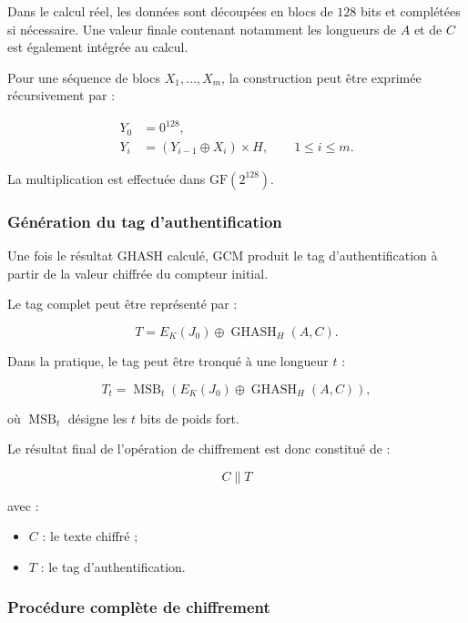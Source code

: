 \documentclass[12pt,a4paper]{article}
\begin{document}
Dans le calcul réel, les données sont découpées en blocs de $128$ bits
et complétées si nécessaire. Une valeur finale contenant notamment
les longueurs de $A$ et de $C$ est également intégrée au calcul.

Pour une séquence de blocs $X_1,\ldots,X_m$, la construction peut être
exprimée récursivement par :

\begin{align}
Y_0 &= 0^{128},\\
Y_i &= (Y_{i-1} \oplus X_i)\times H,
\qquad 1\leq i\leq m.
\end{align}

La multiplication est effectuée dans $\mathrm{GF}(2^{128})$.

\subsubsection{Génération du tag d'authentification}

Une fois le résultat GHASH calculé, GCM produit le tag
d'authentification à partir de la valeur chiffrée du compteur initial.

Le tag complet peut être représenté par :

\begin{equation}
T =
E_K(J_0)
\oplus
\operatorname{GHASH}_H(A,C).
\label{eq:gcm_tag}
\end{equation}

Dans la pratique, le tag peut être tronqué à une longueur $t$ :

\begin{equation}
T_t =
\operatorname{MSB}_t
\left(
E_K(J_0)
\oplus
\operatorname{GHASH}_H(A,C)
\right),
\end{equation}

où $\operatorname{MSB}_t$ désigne les $t$ bits de poids fort.

Le résultat final de l'opération de chiffrement est donc constitué de :

\begin{equation}
\boxed{C \parallel T}
\end{equation}

avec :

\begin{itemize}
    \item $C$ : le texte chiffré ;
    \item $T$ : le tag d'authentification.
\end{itemize}

\subsubsection{Procédure complète de chiffrement}
\end{document}
